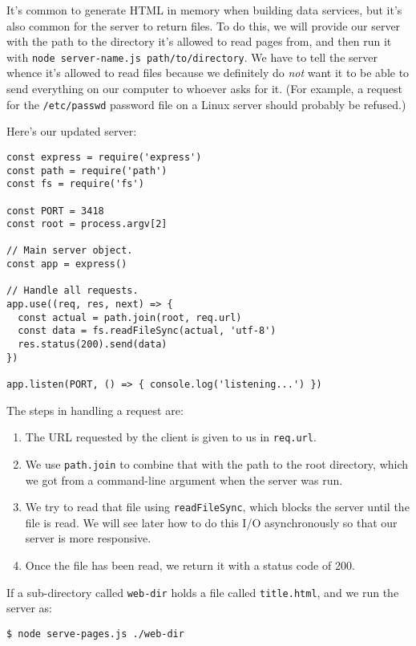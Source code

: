 It's common to generate HTML in memory when building data services,
but it's also common for the server to return files.
To do this,
we will provide our server with the path to the directory it's allowed to read pages from,
and then run it with \texttt{node\ server-name.js\ path/to/directory}.
We have to tell the server whence it's allowed to read files
because we definitely do \emph{not} want it to be able to send everything on our computer to whoever asks for it.
(For example,
a request for the \texttt{/etc/passwd} password file on a Linux server should probably be refused.)

Here's our updated server:

\begin{verbatim}
const express = require('express')
const path = require('path')
const fs = require('fs')

const PORT = 3418
const root = process.argv[2]

// Main server object.
const app = express()

// Handle all requests.
app.use((req, res, next) => {
  const actual = path.join(root, req.url)
  const data = fs.readFileSync(actual, 'utf-8')
  res.status(200).send(data)
})

app.listen(PORT, () => { console.log('listening...') })
\end{verbatim}

The steps in handling a request are:

\begin{enumerate}
\item
  The URL requested by the client is given to us in \texttt{req.url}.
\item
  We use \texttt{path.join} to combine that with the path to the root directory,
  which we got from a command-line argument when the server was run.
\item
  We try to read that file using \texttt{readFileSync},
  which blocks the server until the file is read.
  We will see later how to do this I/O asynchronously
  so that our server is more responsive.
\item
  Once the file has been read, we return it with a status code of 200.
\end{enumerate}

If a sub-directory called \texttt{web-dir} holds a file called \texttt{title.html},
and we run the server as:

\begin{verbatim}
$ node serve-pages.js ./web-dir
\end{verbatim}

